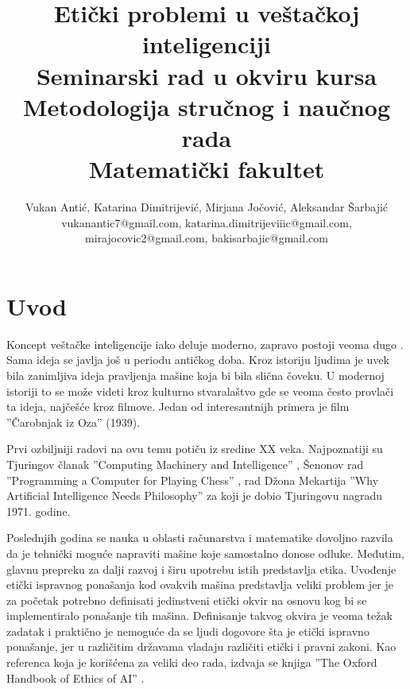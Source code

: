 \documentclass[a4paper]{article}
\begin{document}
\title{Etički problemi u veštačkoj inteligenciji\\ \small{Seminarski rad u okviru kursa\\Metodologija stručnog i naučnog rada\\ Matematički fakultet}}

\author{Vukan Antić, Katarina Dimitrijević, Mirjana Jočović, Aleksandar Šarbajić \\ vukanantic7@gmail.com, katarina.dimitrijeviiic@gmail.com, \\ mirajocovic2@gmail.com, bakisarbajic@gmail.com}


\maketitle


\tableofcontents

\newpage

\section{Uvod}
\label{sec:uvod}


Koncept veštačke inteligencije iako deluje moderno, zapravo postoji veoma dugo \cite{introduction}. Sama ideja se javlja još u periodu antičkog doba. Kroz istoriju ljudima je uvek bila zanimljiva ideja pravljenja mašine koja bi bila slična čoveku. U modernoj istoriji to se može videti kroz kulturno stvaralaštvo gde se veoma često provlači ta ideja, najčešće kroz filmove. Jedan od interesantnijh primera je film ”Čarobnjak iz Oza” (1939).

Prvi ozbiljniji radovi na ovu temu potiču iz sredine XX veka. Najpoznatiji su Tjuringov članak ”Computing Machinery and Intelligence” \cite{turing_compting}, Šenonov rad ”Programming a Computer for Playing Chess” \cite{senon_sah}, rad Džona Mekartija ”Why Artificial Intelligence Needs Philosophy” \cite{mekarti} za koji je dobio Tjuringovu nagradu 1971. godine. 

Poslednjih godina se nauka u oblasti računarstva i matematike dovoljno razvila da je tehnički moguće napraviti mašine koje samostalno donose odluke. Međutim, glavnu prepreku za dalji razvoj i širu upotrebu istih predstavlja etika. Uvođenje etički ispravnog ponašanja kod ovakvih mašina predstavlja veliki problem jer je za početak potrebno definisati jedinstveni etički okvir na osnovu kog bi se implementiralo ponašanje tih mašina. Definisanje takvog okvira je veoma težak zadatak i praktično je nemoguće da se ljudi dogovore šta je etički ispravno ponašanje, jer u različitim državama vladaju različiti etički i pravni zakoni. Kao referenca koja je korišćena za veliki deo rada, izdvaja se knjiga ”The Oxford Handbook of Ethics of AI” \cite{oxford_knjiga}.
\end{document}
